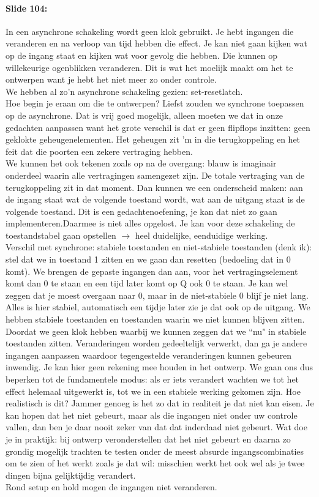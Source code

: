 \documentclass[10pt,a4paper]{book}
\begin{document}
\paragraph{Slide 104:} In een asynchrone schakeling wordt geen klok gebruikt. Je hebt ingangen die veranderen en na verloop van tijd hebben die effect. Je kan niet gaan kijken wat op de ingang staat en kijken wat voor gevolg die hebben. Die kunnen op willekeurige ogenblikken veranderen. Dit is wat het moelijk maakt om het te ontwerpen want je hebt het niet meer zo onder controle.\\
We hebben al zo'n asynchrone schakeling gezien: set-resetlatch.\\
Hoe begin je eraan om die te ontwerpen? Liefst zouden we synchrone toepassen op de asynchrone. Dat is vrij goed mogelijk, alleen moeten we dat in onze gedachten aanpassen want het grote verschil is dat er geen flipflops inzitten: geen geklokte geheugenelementen. Het geheugen zit 'm in die terugkoppeling en het feit dat die poorten een zekere vertraging hebben.\\
We kunnen het ook tekenen zoals op na de overgang: blauw is imaginair onderdeel waarin alle vertragingen samengezet zijn. De totale vertraging van de terugkoppeling zit in dat moment. Dan kunnen we een onderscheid maken: aan de ingang staat wat de volgende toestand wordt, wat aan de uitgang staat is de volgende toestand. Dit is een gedachtenoefening, je kan dat niet zo gaan implementeren.Daarmee is niet alles opgelost. Je kan voor deze schakeling de toestandstabel gaan opstellen $\rightarrow$ heel duidelijke, eenduidige werking.\\
Verschil met synchrone: stabiele toestanden en niet-stabiele toestanden (denk ik): stel dat we in toestand 1 zitten en we gaan dan resetten (bedoeling dat in 0 komt). We brengen de gepaste ingangen dan aan, voor het vertragingselement komt dan 0 te staan en een tijd later komt op Q ook 0 te staan. Je kan wel zeggen dat je moest overgaan naar 0, maar in de niet-stabiele 0 blijf je niet lang. Alles is hier stabiel, automatisch een tijdje later zie je dat ook op de uitgang. We hebben stabiele toestanden en toestanden waarin we niet kunnen blijven zitten.\\
Doordat we geen klok hebben waarbij we kunnen zeggen dat we ``nu" in stabiele toestanden zitten. Veranderingen worden gedeeltelijk verwerkt, dan ga je andere ingangen aanpassen waardoor tegengestelde veranderingen kunnen gebeuren inwendig. Je kan hier geen rekening mee houden in het ontwerp. We gaan ons dus beperken tot de fundamentele modus: als er iets verandert wachten we tot het effect helemaal uitgewerkt is, tot we in een stabiele werking gekomen zijn. Hoe realistisch is dit? Jammer genoeg is het zo dat in realiteit je dat niet kan eisen. Je kan hopen dat het niet gebeurt, maar als die ingangen niet onder uw controle vallen, dan ben je daar nooit zeker van dat dat inderdaad niet gebeurt. Wat doe je in praktijk: bij ontwerp veronderstellen dat het niet gebeurt en daarna zo grondig mogelijk trachten te testen onder de meest absurde ingangscombinaties om te zien of het werkt zoals je dat wil: misschien werkt het ook wel als je twee dingen bijna gelijktijdig verandert.\\
Rond setup en hold mogen de ingangen niet veranderen.
\end{document}
